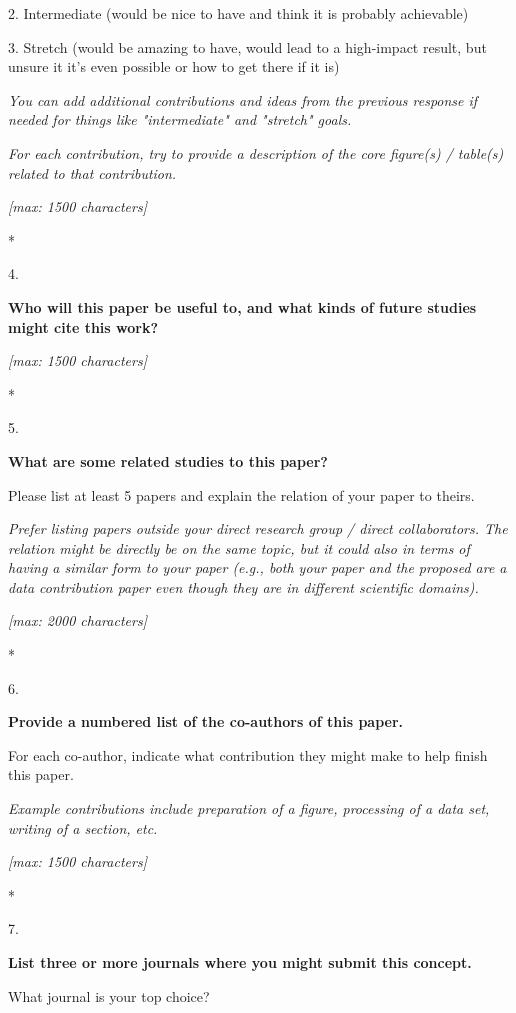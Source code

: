 \documentclass[]{article}
\begin{document}
2. Intermediate (would be nice to have and think it is probably
achievable)

3. Stretch (would be amazing to have, would lead to a high-impact
result, but unsure it it's even possible or how to get there if it is)

\emph{You can add additional contributions and ideas from the previous
response if needed for things like "intermediate" and "stretch" goals.}

\emph{For each contribution, try to provide a description of the core
figure(s) / table(s) related to that contribution.}

\emph{{[}max: 1500 characters{]}}

*

4.

\textbf{Who will this paper be useful to, and what kinds of future
studies might cite this work?}

\emph{{[}max: 1500 characters{]}}

*

5.

\textbf{What are some related studies to this paper?}~

Please list at least 5 papers and explain the relation of your paper to
theirs.

\emph{Prefer listing papers outside your direct research group / direct
collaborators. The relation might be directly be on the same topic, but
it could also in terms of having a similar form to your paper (e.g.,
both your paper and the proposed are a data contribution paper even
though they are in different scientific domains).}~

\emph{{[}max: 2000 characters{]}}

*

6.

\textbf{Provide a numbered list of the co-authors of this paper.}

For each co-author, indicate what contribution they might make to help
finish this paper.

\emph{Example contributions include preparation of a figure, processing
of a data set, writing of a section, etc.}

\emph{{[}max: 1500 characters{]}}

*

7.

\textbf{List three or more journals where you might submit this
concept.}

What journal is your top choice?
\end{document}
